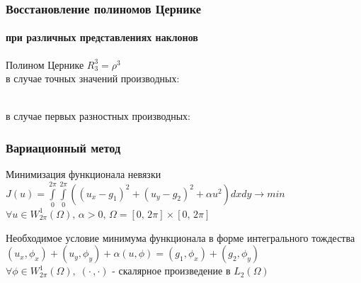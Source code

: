 \documentclass[11pt]{beamer}
\begin{document}
\begin{frame}
\frametitle{Восстановление полиномов Цернике}
\framesubtitle{при различных представлениях наклонов}
Полином Цернике $R_3^3=\rho^3 $ 
\\в случае точных значений производных:
\begin{minipage}[h]{1\linewidth}
\end{minipage}
\\в случае первых разностных производных:
\begin{minipage}[h]{1\linewidth}
\end{minipage}
\end{frame}

\begin{frame}
\frametitle{Вариационный метод}

\begin{block}{Минимизация функционала невязки}
$J(u) = \int \limits_0^{2\pi} \int \limits_0^{2\pi} ((u_x - g_1)^2 + (u_y-g_2)^2 + \alpha u^2 )dxdy \rightarrow min$ \\$ \forall u \in W_{2\pi}^{1}(\Omega),\, \alpha > 0,\,\Omega = [0,\,2\pi]  \times [0,\,2\pi]$
\end{block}
\begin{block}{Необходимое условие минимума функционала в форме интегрального тождества}
$(u_x, \phi_x) + (u_y,\phi_y) + \alpha(u, \phi) = (g_1, \phi_x) + (g_2, \phi_y)$\\$\forall\phi \in W_{2\pi}^{1}(\Omega),\;(\cdot\,,\cdot)$ - скалярное произведение в $L_2(\Omega)$
\end{block}
\end{frame}
\end{document}
